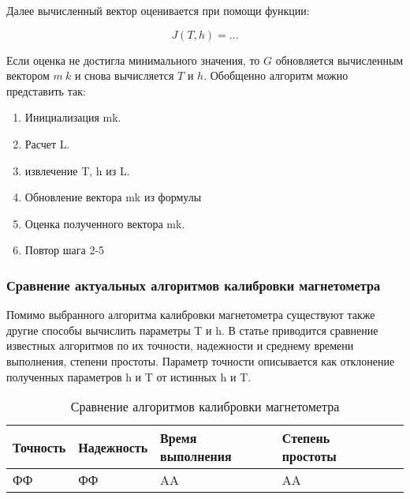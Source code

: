 Далее вычисленный вектор оценивается при помощи функции:

$$ J(T, h) = ... $$

Если оценка не достигла минимального значения, то $G$ обновляется вычисленным вектором $m~k$ и снова вычисляется $T$ и $h$.
Обобщенно алгоритм можно представить так:
\begin{enumerate}
    \item Инициализация mk.
    \item Расчет L.
    \item извлечение T, h из L.
    \item Обновление вектора mk из формулы 
    \item Оценка полученного вектора mk.
    \item Повтор шага 2-5
\end{enumerate}

\subsubsection{Сравнение актуальных алгоритмов калибровки магнетометра}

Помимо выбранного алгоритма калибровки магнетометра существуют также другие способы вычислить параметры T и h. 
В статье %
приводится сравнение известных алгоритмов по их точности, надежности и среднему времени выполнения, степени простоты.
Параметр точности описывается как отклонение полученных параметров h и T от истинных h и T.

\begin{table}[ht]
    \caption{Сравнение алгоритмов калибровки магнетометра}
    \label{table:domain:magnet_calib_comp}
    \begin{tabular}{| >{\raggedright}m{}
                    | >{\raggedright\arraybackslash}m{}|
                    | >{\raggedright\arraybackslash}m{}|
                    | >{\raggedright\arraybackslash}m{}|
                    | >{\raggedright\arraybackslash}m{}|}
        \hline
        \centering Точность & 
        \centering\arraybackslash Надежность &
        \centering\arraybackslash Время выполнения &
        \centering\arraybackslash Степень простоты
        \\

        \hline
        ФФ & ФФ & AA & AA \\

        \hline
    \end{tabular}
\end{table}

